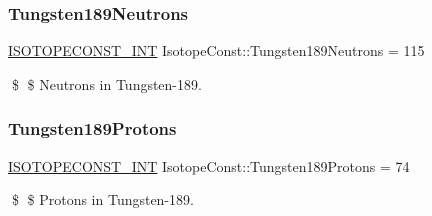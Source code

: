 \subsubsection{\texorpdfstring{Tungsten189\+Neutrons}{Tungsten189Neutrons}}
{\footnotesize\ttfamily \mbox{\hyperlink{group___isotope_const-_macros_ga5f18360b3e99483a35c32d789e62621c}{I\+S\+O\+T\+O\+P\+E\+C\+O\+N\+S\+T\+\_\+\+I\+NT}} Isotope\+Const\+::\+Tungsten189\+Neutrons = 115}

\$ \$ Neutrons in Tungsten-\/189. \mbox{\label{group___isotope_const-_tungsten-_w189_gae5b0279b39a38fce13b7021390608cd4}} 
\subsubsection{\texorpdfstring{Tungsten189\+Protons}{Tungsten189Protons}}
{\footnotesize\ttfamily \mbox{\hyperlink{group___isotope_const-_macros_ga5f18360b3e99483a35c32d789e62621c}{I\+S\+O\+T\+O\+P\+E\+C\+O\+N\+S\+T\+\_\+\+I\+NT}} Isotope\+Const\+::\+Tungsten189\+Protons = 74}

\$ \$ Protons in Tungsten-\/189. 